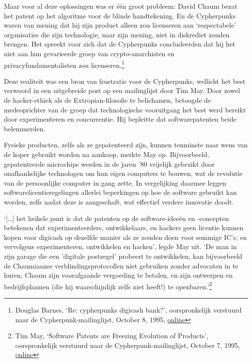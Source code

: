 \documentclass[
  a5paper,
  smalldemyvopaper,11pt,twoside,onecolumn,openright,extrafontsizes]{memoir}
\begin{document}
Maar voor al deze oplossingen was er één groot probleem: David Chaum
bezat het patent op het algoritme voor de blinde handtekening. En de
Cypherpunks waren van mening dat hij zijn product alleen zou licenseren
aan `respectabele' organisaties die zijn technologie, naar zijn mening,
niet in diskrediet zouden brengen. Het spreekt voor zich dat de
Cypherpunks concludeerden dat hij het niet aan hun gevarieerde groep van
crypto-anarchisten en privacyfundamentalisten zou licenseren.\footnote{Douglas
  Barnes, `Re: cypherpunks digicash bank?', oorspronkelijk verstuurd
  naar de Cypherpunk-mailinglijst, October 8, 1995,
  \href{https://cypherpunks.venona.com/date/1995/10/msg00731.html}{online}}

Deze realiteit was een bron van frustratie voor de Cypherpunks, wellicht
het best verwoord in een uitgebreide post op een mailinglijst door Tim
May. Door zowel de hacker-ethiek als de Extropian-filosofie te
belichamen, betoogde de medeoprichter van de groep dat technologische
vooruitgang het best werd bereikt door experimenteren en concurrentie.
Hij bepleitte dat softwarepatenten beide belemmerden.

Fysieke producten, zelfs als ze gepatenteerd zijn, kunnen tenminste naar
wens van de koper gebruikt worden na aankoop, merkte May op.
Bijvoorbeeld, gepatenteerde microchips werden in de jaren '80 vrijelijk
gebruikt door onafhankelijke technologen om hun eigen computers te
bouwen, wat de revolutie van de persoonlijke computer in gang zette. In
vergelijking daarmee leggen softwarelicentieregelingen allerlei
beperkingen op hoe de software gebruikt kan worden, zelfs nadat deze is
aangeschaft, wat effectief verdere innovatie doodt.

`{[}\ldots{]} het heikele punt is dat de patenten op de software-ideeën
en -concepten betekenen dat experimenteerders, ontwikkelaars, en hackers
geen licentie kunnen kopen voor digicash op dezelfde manier als ze
zouden doen voor sommige IC's; en vervolgens experimenteren, ontwikkelen
en hacken', legde May uit. `De man in zijn garage die een 'digitale
postzegel' probeert te ontwikkelen, kan bijvoorbeeld de Chaumiaanse
verblindingsprotocollen niet gebruiken zonder advocaten in te huren,
Chaum zijn voorafgaande vergoeding te betalen, en zijn ontwerpen en
bedrijfsplannen (die hij waarschijnlijk zelfs niet heeft!) te
openbaren.'\footnote{Tim May, `Software Patents are Freezing Evolution
  of Products', oorspronkelijk verstuurd naar de
  Cypherpunk-mailinglijst, October 7, 1995,
  \href{https://cypherpunks.venona.com/date/1995/10/msg00685.html}{online}}
\end{document}
